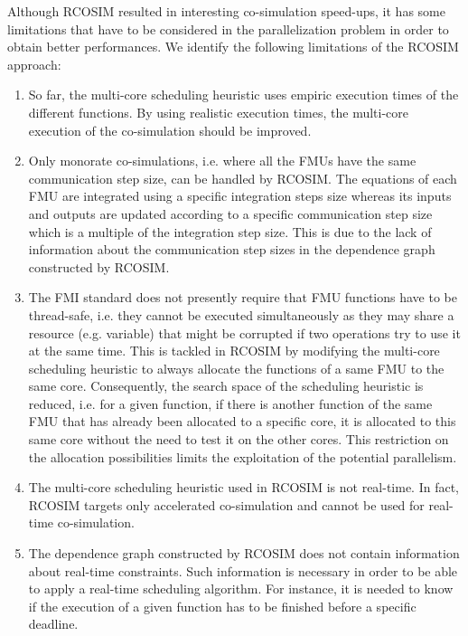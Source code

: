 Although RCOSIM resulted in interesting co-simulation speed-ups, it has some limitations that have to be considered in the parallelization problem in order to obtain better performances. We identify the following limitations of the RCOSIM approach:

\begin{enumerate}

\item So far, the multi-core scheduling heuristic uses empiric execution times of the different functions. By using realistic execution times, the multi-core execution of the co-simulation should be improved.

\item Only monorate co-simulations, i.e. where all the FMUs have the same communication step size, can be handled by RCOSIM. The equations of each FMU are integrated using a specific integration steps size whereas its inputs and outputs are updated according to a specific communication step size which is a multiple of the integration step size. This is due to the lack of information about the communication step sizes in the dependence graph constructed by RCOSIM.

\item The FMI standard does not presently require that FMU functions have to be thread-safe, i.e. they cannot be executed simultaneously as they may share a resource (e.g. variable) that might be corrupted if two operations try to use it at the same time. This is tackled in RCOSIM by modifying the multi-core scheduling heuristic to always allocate the functions of a same FMU to the same core. Consequently, the search space of the scheduling heuristic is reduced, i.e. for a given function, if there is another function of the same FMU that has already been allocated to a specific core, it is allocated to this same core without the need to test it on the other cores. This restriction on the allocation possibilities limits the exploitation of the potential parallelism.

\item The multi-core scheduling heuristic used in RCOSIM is not real-time. In fact, RCOSIM targets only accelerated co-simulation and cannot be used for real-time co-simulation.

\item The dependence graph constructed by RCOSIM does not contain information about real-time constraints. Such information is necessary in order to be able to apply a real-time scheduling algorithm. For instance, it is needed to know if the execution of a given function has to be finished before a specific deadline.

\end{enumerate} 

